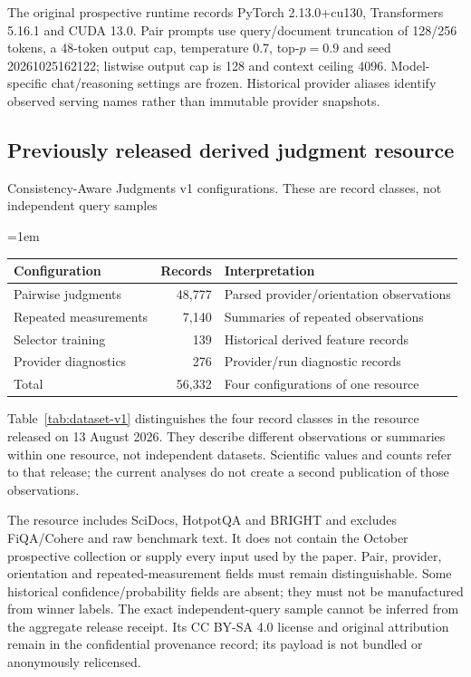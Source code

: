 \documentclass[pdflatex,sn-basic,Numbered]{sn-jnl}
\renewcommand{\papertable}{\small\renewcommand{\arraystretch}{1.15}\setlength{\tabcolsep}{4pt}\emergencystretch=1em}
\begin{document}
The original prospective runtime records PyTorch 2.13.0+cu130, Transformers 5.16.1 and CUDA 13.0. Pair prompts use query/document truncation of 128/256 tokens, a 48-token output cap, temperature 0.7, top-$p=0.9$ and seed 20261025162122; listwise output cap is 128 and context ceiling 4096. Model-specific chat/reasoning settings are frozen. Historical provider aliases identify observed serving names rather than immutable provider snapshots.

\subsection{Previously released derived judgment resource}
\begin{supplementtable}
\caption{Consistency-Aware Judgments v1 configurations. These are record classes, not independent query samples}
\label{tab:dataset-v1}\papertable
\begin{tabularx}{\linewidth}{@{}YrY@{}}\toprule
Configuration & Records & Interpretation\\\midrule
Pairwise judgments&48,777&Parsed provider/orientation observations\\\addlinespace
Repeated measurements&7,140&Summaries of repeated observations\\\addlinespace
Selector training&139&Historical derived feature records\\\addlinespace
Provider diagnostics&276&Provider/run diagnostic records\\\midrule
Total&56,332&Four configurations of one resource\\\bottomrule
\end{tabularx}
\end{supplementtable}
Table~\ref{tab:dataset-v1} distinguishes the four record classes in the resource released on 13 August 2026. They describe different observations or summaries within one resource, not independent datasets. Scientific values and counts refer to that release; the current analyses do not create a second publication of those observations.

The resource includes SciDocs, HotpotQA and BRIGHT and excludes FiQA/Cohere and raw benchmark text. It does not contain the October prospective collection or supply every input used by the paper. Pair, provider, orientation and repeated-measurement fields must remain distinguishable. Some historical confidence/probability fields are absent; they must not be manufactured from winner labels. The exact independent-query sample cannot be inferred from the aggregate release receipt. Its CC BY-SA 4.0 license and original attribution remain in the confidential provenance record; its payload is not bundled or anonymously relicensed.
\end{document}
